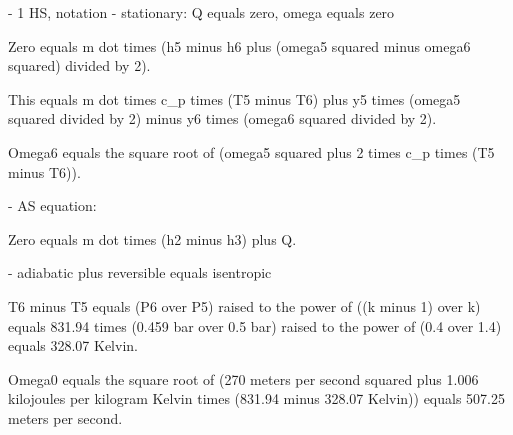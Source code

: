- 1 HS, notation
- stationary: Q equals zero, omega equals zero

Zero equals m dot times (h5 minus h6 plus (omega5 squared minus omega6 squared) divided by 2).

This equals m dot times c_p times (T5 minus T6) plus y5 times (omega5 squared divided by 2) minus y6 times (omega6 squared divided by 2).

Omega6 equals the square root of (omega5 squared plus 2 times c_p times (T5 minus T6)).

- AS equation:

Zero equals m dot times (h2 minus h3) plus Q.

- adiabatic plus reversible equals isentropic

T6 minus T5 equals (P6 over P5) raised to the power of ((k minus 1) over k) equals 831.94 times (0.459 bar over 0.5 bar) raised to the power of (0.4 over 1.4) equals 328.07 Kelvin.

Omega0 equals the square root of (270 meters per second squared plus 1.006 kilojoules per kilogram Kelvin times (831.94 minus 328.07 Kelvin)) equals 507.25 meters per second.